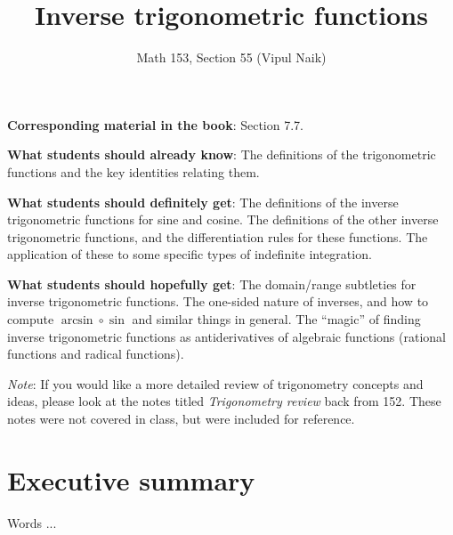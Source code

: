 \documentclass{amsart}
\title{Inverse trigonometric functions}
\author{Math 153, Section 55 (Vipul Naik)}
\begin{document}
\maketitle

{\bf Corresponding material in the book}: Section 7.7.

{\bf What students should already know}: The definitions of the
trigonometric functions and the key identities relating them.

{\bf What students should definitely get}: The definitions of the
inverse trigonometric functions for sine and cosine. The definitions
of the other inverse trigonometric functions, and the differentiation
rules for these functions. The application of these to some specific
types of indefinite integration.

{\bf What students should hopefully get}: The domain/range subtleties
for inverse trigonometric functions. The one-sided nature of inverses,
and how to compute $\arcsin \circ \sin$ and similar things in
general. The ``magic'' of finding inverse trigonometric functions as
antiderivatives of algebraic functions (rational functions and radical
functions).

{\em Note}: If you would like a more detailed review of trigonometry
concepts and ideas, please look at the notes titled {\em Trigonometry
review} back from 152. These notes were not covered in class, but were
included for reference.

\section*{Executive summary}

Words ...
\end{document}

